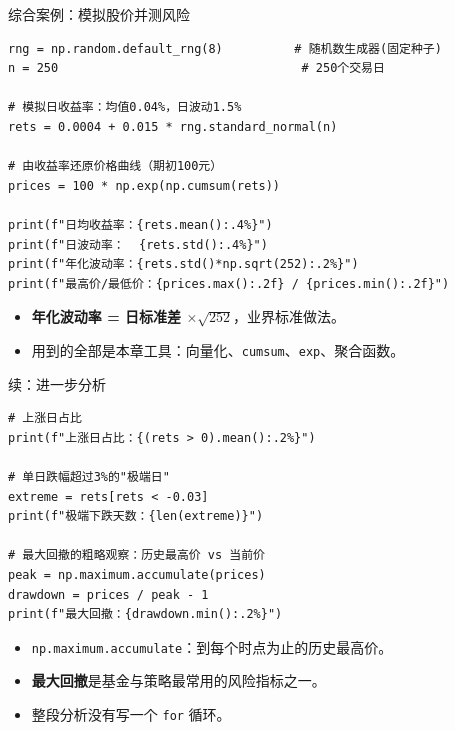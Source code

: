 \documentclass[9pt]{ctexbeamer}
\begin{document}
\begin{frame}[fragile]{综合案例：模拟股价并测风险}
	\begin{lstlisting}
rng = np.random.default_rng(8)          # 随机数生成器(固定种子)
n = 250                                  # 250个交易日

# 模拟日收益率：均值0.04%，日波动1.5%
rets = 0.0004 + 0.015 * rng.standard_normal(n)

# 由收益率还原价格曲线（期初100元）
prices = 100 * np.exp(np.cumsum(rets))

print(f"日均收益率：{rets.mean():.4%}")
print(f"日波动率：  {rets.std():.4%}")
print(f"年化波动率：{rets.std()*np.sqrt(252):.2%}")
print(f"最高价/最低价：{prices.max():.2f} / {prices.min():.2f}")
\end{lstlisting}
	\begin{itemize}
		\item \textbf{年化波动率 = 日标准差 $\times\sqrt{252}$}，业界标准做法。
		\item 用到的全部是本章工具：向量化、\texttt{cumsum}、\texttt{exp}、聚合函数。
	\end{itemize}
\end{frame}

\begin{frame}[fragile]{续：进一步分析}
	\begin{lstlisting}
# 上涨日占比
print(f"上涨日占比：{(rets > 0).mean():.2%}")

# 单日跌幅超过3%的"极端日"
extreme = rets[rets < -0.03]
print(f"极端下跌天数：{len(extreme)}")

# 最大回撤的粗略观察：历史最高价 vs 当前价
peak = np.maximum.accumulate(prices)
drawdown = prices / peak - 1
print(f"最大回撤：{drawdown.min():.2%}")
\end{lstlisting}
	\begin{itemize}
		\item \texttt{np.maximum.accumulate}：到每个时点为止的历史最高价。
		\item \textbf{最大回撤}是基金与策略最常用的风险指标之一。
		\item 整段分析没有写一个 \texttt{for} 循环。
	\end{itemize}
\end{frame}
\end{document}
